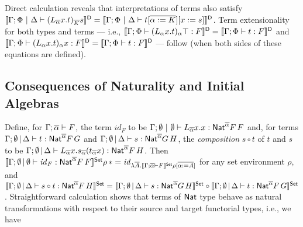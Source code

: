 \documentclass[runningheads]{llncs}
\renewcommand{\id}{\mathit{id}}
\renewcommand{\id}{\mathit{id}}
\begin{document}
Direct calculation reveals that interpretations of terms also
satisfy
$\llbracket{\Gamma; \Phi~|~\Delta \vdash
  (L_{\overline{\alpha}}x.t)_{\overline{K}}s}\rrbracket^{\mathsf D} = \llbracket{\Gamma; \Phi~|~\Delta
  \vdash t [\overline{\alpha := K}][x := s]}\rrbracket^{\mathsf D}$.
Term extensionality for both types and terms --- i.e.,
$\llbracket{\Gamma;\Phi\vdash (L_\alpha x.t)_\alpha \top : F}\rrbracket^{\mathsf D} =
\llbracket{\Gamma;\Phi \vdash t : F}\rrbracket^{\mathsf D}$ and
$\llbracket{\Gamma;\Phi\vdash (L_\alpha x.t)_\alpha x : F}\rrbracket^{\mathsf D} =
\llbracket{\Gamma;\Phi \vdash t : F}\rrbracket^{\mathsf D}$
--- follow (when both sides of these equations are defined).

\vspace*{-0.1in}

\subsection{Consequences of Naturality and Initial
  Algebras}\label{sec:Nat-type-terms} 

\vspace*{-0.05in}

Define, for $\Gamma; \overline{\alpha} \vdash F$, the term $\id_F$ to be
$\Gamma;\emptyset~|~\emptyset \vdash L_{\overline{\alpha}}x.x :
\mathsf{Nat}^{\overline{\alpha}} F\,F$ and, for terms $\Gamma; \emptyset \,|\,
\Delta \vdash t: \mathsf{Nat}^{\overline{\alpha}} F\,G$ and $\Gamma; \emptyset
\,|\, \Delta \vdash s: \mathsf{Nat}^{\overline{\alpha}} G\,H$, the {\em
  composition} $s \circ t$ of $t$ and $s$ to be $\Gamma;
\emptyset\,|\, \Delta \vdash L_{\overline{\alpha}}
x. s_{\overline{\alpha}}(t_{\overline{\alpha}}x):
\mathsf{Nat}^{\overline{\alpha}} F\,H$. Then $\setsem{\Gamma; \emptyset \,|\,
  \emptyset \vdash \id_{F} : \Nat^{\ol{\alpha}} F\,F} \rho\, \ast =
\id_{\lambda \ol{A}. \setsem{\Gamma; \ol{\alpha} \vdash F} \rho
  [\ol{\alpha := A}]}$ for any set environment $\rho$, and
$\llbracket{\Gamma; \emptyset \,|\, \Delta \vdash s \circ t:
  \mathsf{Nat}^{\overline{\alpha}} F\,H}\rrbracket^{\mathsf{Set}} = \llbracket{\Gamma; \emptyset \,|\,
  \Delta \vdash s: \mathsf{Nat}^{\overline{\alpha}} G\,H}\rrbracket^{\mathsf{Set}} \circ
\llbracket{\Gamma; \emptyset \,|\, \Delta \vdash t:
  \mathsf{Nat}^{\overline{\alpha}} F\,G}\rrbracket^{\mathsf{Set}}$. Straightforward calculation shows
that terms of $\mathsf{Nat}$ type behave as natural transformations with
respect to their source and target functorial types, i.e., we have
\end{document}
